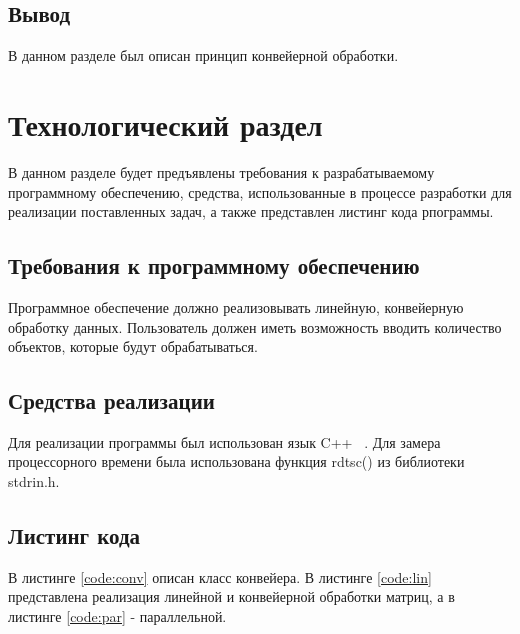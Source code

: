 \documentclass[12pt, a4paper]{report}
\begin{document}
	\section{Вывод}
	\hspace{0.5cm}В данном разделе был описан принцип конвейерной обработки.
	
	\chapter{Технологический раздел}
	\hspace{0.5cm}В данном разделе будет предъявлены требования к разрабатываемому программному обеспечению, средства, использованные в процессе разработки для реализации поставленных задач, а также представлен листинг кода рпограммы. 
	
	\section{Требования к программному обеспечению}
	\hspace{0.5cm}Программное обеспечение должно реализовывать линейную, конвейерную обработку данных. Пользователь должен иметь возможность вводить количество объектов, которые будут обрабатываться.
	\section{Средства реализации}
	\hspace{0.5cm}Для реализации программы был использован язык C++ ~\cite{CPP}. Для замера процессорного времени была использована функция rdtsc() из библиотеки stdrin.h.
	
	
	\section{Листинг кода}
	\hspace{0.5cm} В листинге \ref{code:conv} описан класс конвейера. В листинге \ref{code:lin} представлена реализация линейной и конвейерной обработки матриц, а в листинге \ref{code:par} - параллельной.
	
\end{document}
